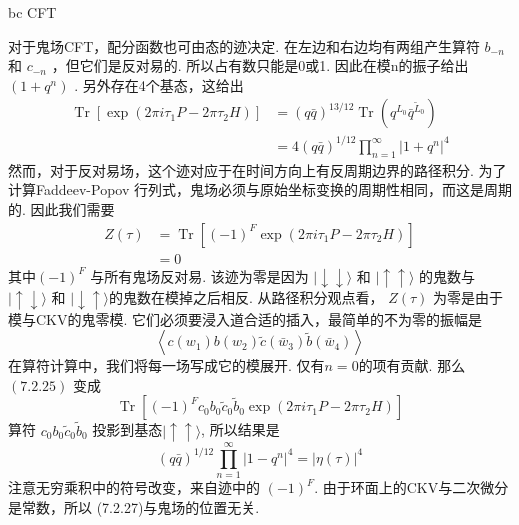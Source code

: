 \centerline{\Large  bc CFT}
对于鬼场CFT，配分函数也可由态的迹决定. 在左边和右边均有两组产生算符 $b_{-n}$ 和 $c_{-n}$ ，但它们是反对易的. 所以占有数只能是0或1. 因此在模n的振子给出 $\left(1+q^{n}\right) $ . 另外存在4个基态，这给出
\begin{equation}
\begin{aligned}
\operatorname{Tr}\left[\exp \left(2 \pi i \tau_{1} P-2 \pi \tau_{2} H\right)\right] &=(q \bar{q})^{13 / 12} \operatorname{Tr}\left(q^{L_{0}} \bar{q}^{\tilde{L}_{0}}\right) \\
&=4(q \bar{q})^{1 / 12} \prod_{n=1}^{\infty}\left|1+q^{n}\right|^{4}
\end{aligned}
\end{equation}
然而，对于反对易场，这个迹对应于在时间方向上有反周期边界的路径积分. 为了计算Faddeev-Popov 行列式，鬼场必须与原始坐标变换的周期性相同，而这是周期的. 因此我们需要
\begin{equation}
\begin{aligned}
Z(\tau) &=\operatorname{Tr}\left[(-1)^{F} \exp \left(2 \pi i \tau_{1} P-2 \pi \tau_{2} H\right)\right] \\
&=0
\end{aligned}
\end{equation}
其中$(-1)^{F}$ 与所有鬼场反对易. 该迹为零是因为 $|\downarrow \downarrow\rangle$ 和 $|\uparrow \uparrow\rangle$ 的鬼数与 $|\uparrow \downarrow\rangle$ 和 $|\downarrow \uparrow\rangle $的鬼数在模掉之后相反. 从路径积分观点看， $Z(\tau)$ 为零是由于模与CKV的鬼零模. 它们必须要浸入道合适的插入，最简单的不为零的振幅是
\begin{equation}
\left\langle c\left(w_{1}\right) b\left(w_{2}\right) \tilde{c}\left(\bar{w}_{3}\right) \tilde{b}\left(\bar{w}_{4}\right)\right\rangle
\end{equation}
在算符计算中，我们将每一场写成它的模展开. 仅有$n=0$的项有贡献. 那么$(7.2 .25)$ 变成
\begin{equation}
\operatorname{Tr}\left[(-1)^{F} c_{0} b_{0} \tilde{c}_{0} \tilde{b}_{0} \exp \left(2 \pi i \tau_{1} P-2 \pi \tau_{2} H\right)\right]
\end{equation}
算符 $c_{0} b_{0} \tilde{c}_{0} \tilde{b}_{0}$ 投影到基态$|\uparrow \uparrow\rangle$, 所以结果是
\begin{equation}
(q \bar{q})^{1 / 12} \prod_{n=1}^{\infty}\left|1-q^{n}\right|^{4}=|\eta(\tau)|^{4}
\end{equation}
注意无穷乘积中的符号改变，来自迹中的 $(-1)^{F}$. 由于环面上的CKV与二次微分是常数，所以 (7.2.27)与鬼场的位置无关.\\

